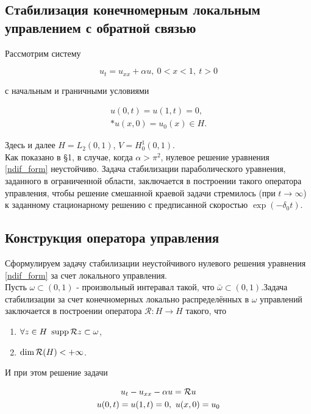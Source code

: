 \subsection{Стабилизация конечномерным локальным управлением с обратной связью}

Рассмотрим систему

\begin{equation}\label{ndif_form}
    u_t = u_{xx} + \alpha u, \ 0 < x < 1, \ t > 0
\end{equation}

с начальным и граничными условиями

\begin{gather}
    u(0, t) = u(1, t) = 0, \\*
    u(x, 0) = u_{0}(x) \in H .\nonumber
\end{gather}

Здесь и далее $H = L_2(0, 1)$, $V = H^1_0(0, 1)$.\\
Как показано в \S 1, в случае, когда $\alpha > \pi^2$, нулевое решение уравнения 
\eqref{ndif_form} неустойчиво.
Задача стабилизации параболического уравнения, заданного в ограниченной области,
заключается в построении такого оператора управления, чтобы решение смешанной 
краевой задачи стремилось (при $t \rightarrow \infty$) к заданному стационарному 
решению с предписанной скоростью $\exp (-\delta_0t)$.

\subsection{Конструкция оператора управления}
Сформулируем задачу стабилизации неустойчивого нулевого решения уравнения 
\eqref{ndif_form} за счет локального управления.\\

Пусть $\omega \subset (0, 1)$ - произвольный интеравал такой, что 
$\bar{\omega} \subset (0, 1)$.Задача стабилизации за счет конечномерных локально 
распределённых в $\omega$ управлений заключается в построении оператора 
$\mathcal{R} : H \rightarrow H$ такого, что

\begin{enumerate}
    \item $\forall z \in H \ \mathop{\mathrm{supp}} \mathcal{R}{z} \subset \omega$,
    \item $\dim \mathcal{R}{(H)} < +\infty$.
\end{enumerate}

И при этом решение задачи

\begin{gather}
    u_t - u_{xx} - \alpha u = \mathcal{R}{u} \nonumber\\
    u(0, t) = u(1, t) = 0, \ u(x, 0) = u_0 \nonumber
\end{gather}

